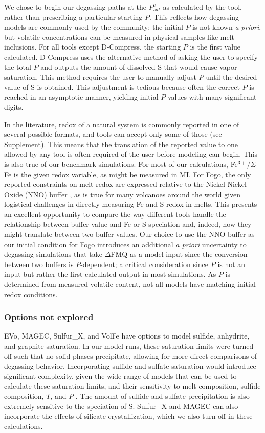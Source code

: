 \documentclass[draft, english]{volcanica-template}
\begin{document}
We chose to begin our degassing paths at the $P^v_{sat}$ as calculated by the tool, rather than prescribing a particular starting $P$. This reflects how degassing models are commonly used by the community: the initial $P$ is not known \textit{a priori}, but volatile concentrations can be measured in physical samples like melt inclusions. For all tools except D-Compress, the starting $P$ is the first value calculated. D-Compress uses the alternative method of asking the user to specify the total $P$ and outputs the amount of dissolved S that would cause vapor saturation. This method requires the user to manually adjust $P$ until the desired value of S is obtained. This adjustment is tedious because often the correct $P$ is reached in an asymptotic manner, yielding initial $P$ values with many significant digits. 

In the literature, redox of a natural system is commonly reported in one of several possible formats, and tools can accept only some of those (see Supplement). This means that the translation of the reported value to one allowed by any tool is often required of the user before modeling can begin. This is also true of our benchmark simulations. For most of our calculations, Fe$^{3+}$/$\Sigma$Fe is the given redox variable, as might be measured in MI. For Fogo, the only reported constraints on melt redox are expressed relative to the Nickel-Nickel Oxide (NNO) buffer \parencite{devitre2023oceanic}, as is true for many volcanoes around the world given logistical challenges in directly measuring Fe and S redox in melts. This presents an excellent opportunity to compare the way different tools handle the relationship between buffer value and Fe or S speciation and, indeed, how they might translate between two buffer values. Our choice to use the NNO buffer as our initial condition for Fogo introduces an additional \textit{a priori} uncertainty to degassing simulations that take $\Delta$FMQ as a model input since the conversion between two buffers is $P$-dependent; a critical consideration since $P$ is not an input but rather the first calculated output in most simulations. As $P$ is determined from measured volatile content, not all models have matching initial redox conditions. 

\subsubsection{Options not explored}
\label{sec:non-explored-options}
EVo, MAGEC, Sulfur\_X, and VolFe have options to model sulfide, anhydrite, and graphite saturation. In our model runs, these saturation limits were turned off such that no solid phases precipitate, allowing for more direct comparisons of degassing behavior. Incorporating sulfide and sulfate saturation would introduce significant complexity, given the wide range of models that can be used to calculate these saturation limits, and their sensitivity to melt composition, sulfide composition, $T$, and $P$ \parencite{wieser2020chalcophile}. The amount of sulfide and sulfate precipitation is also extremely sensitive to the speciation of S. Sulfur\_X and MAGEC can also incorporate the effects of silicate crystallization, which we also turn off in these calculations.
\end{document}
